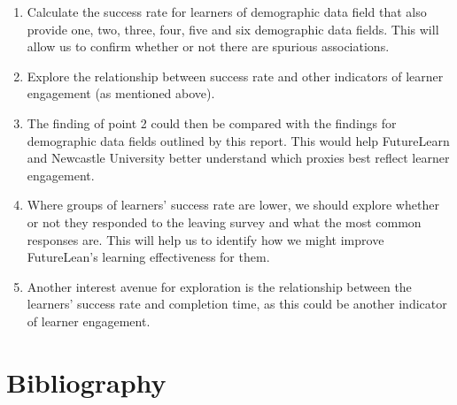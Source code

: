 \documentclass[
]{article}
\begin{document}
\begin{enumerate}
\def\labelenumi{\arabic{enumi}.}
\item
  Calculate the success rate for learners of demographic data field that
  also provide one, two, three, four, five and six demographic data
  fields. This will allow us to confirm whether or not there are
  spurious associations.
\item
  Explore the relationship between success rate and other indicators of
  learner engagement (as mentioned above).
\item
  The finding of point 2 could then be compared with the findings for
  demographic data fields outlined by this report. This would help
  FutureLearn and Newcastle University better understand which proxies
  best reflect learner engagement.
\item
  Where groups of learners' success rate are lower, we should explore
  whether or not they responded to the leaving survey and what the most
  common responses are. This will help us to identify how we might
  improve FutureLean's learning effectiveness for them.
\item
  Another interest avenue for exploration is the relationship between
  the learners' success rate and completion time, as this could be
  another indicator of learner engagement.
\end{enumerate}

\newpage

\hypertarget{bibliography}{%
\section*{Bibliography}\label{bibliography}}
\end{document}
